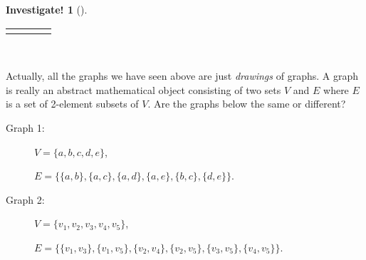 \documentclass[10pt,]{book}
\theoremstyle{plain}
\theoremstyle{definition}
\theoremstyle{definition}
\theoremstyle{definition}
\newtheorem{investigation}[project]{Investigate!}
\theoremstyle{definition}
\numberwithin{equation}{chapter}
\newlength{\panelmax}
\newcommand{\vtx}[2]{node[fill,circle,inner sep=0pt, minimum size=4pt,label=#1:#2]{}}
\renewcommand{\v}{\vtx{above}{}}
\begin{document}
\begin{investigation}[]
{\begin{lrbox}{\panelboxDimage}
{{
}
}\end{lrbox}
\ifdefined\phDimage\else\newlength{\phDimage}\fi%
\setlength{\phDimage}{\ht\panelboxDimage+\dp\panelboxDimage}
\settototalheight{\phDimage}{\usebox{\panelboxDimage}}
\setlength{\panelmax}{\maxof{\panelmax}{\phDimage}}
\leavevmode%
\setlength{\tabcolsep}{0.035\linewidth}
\par\medskip\noindent
\hspace*{0.035\linewidth}%
\begin{tabular}{@{}*{4}{c}@{}}
\begin{minipage}[c][\panelmax][b]{0.18\linewidth}\usebox{\panelboxAimage}\end{minipage}&
\begin{minipage}[c][\panelmax][b]{0.18\linewidth}\usebox{\panelboxBimage}\end{minipage}&
\begin{minipage}[c][\panelmax][b]{0.18\linewidth}\usebox{\panelboxCimage}\end{minipage}&
\begin{minipage}[c][\panelmax][b]{0.18\linewidth}\usebox{\panelboxDimage}\end{minipage}\end{tabular}\\
}%
\par
\hypertarget{p-1471}{}%
Actually, all the graphs we have seen above are just \emph{drawings} of graphs. A graph is really an abstract mathematical object consisting of two sets \(V\) and \(E\) where \(E\) is a set of 2-element subsets of \(V\). Are the graphs below the same or different? %
\begin{description}
\item[{Graph 1:}]\hypertarget{li-683}{}\hypertarget{p-1472}{}%
\(V = \{a, b, c, d, e\}\),%
\par
\hypertarget{p-1473}{}%
\(E = \{\{a,b\}, \{a, c\}, \{a,d\}, \{a,e\}, \{b,c\}, \{d,e\}\}\).%
\item[{Graph 2:}]\hypertarget{li-684}{}\hypertarget{p-1474}{}%
\(V = \{v_1, v_2, v_3, v_4, v_5\}\),%
\par
\hypertarget{p-1475}{}%
\(E = \{\{v_1, v_3\}, \{v_1, v_5\}, \{v_2, v_4\}, \{v_2, v_5\}, \{v_3, v_5\}, \{v_4, v_5\}\}\).%
\end{description}
%
\end{investigation}
\end{document}
